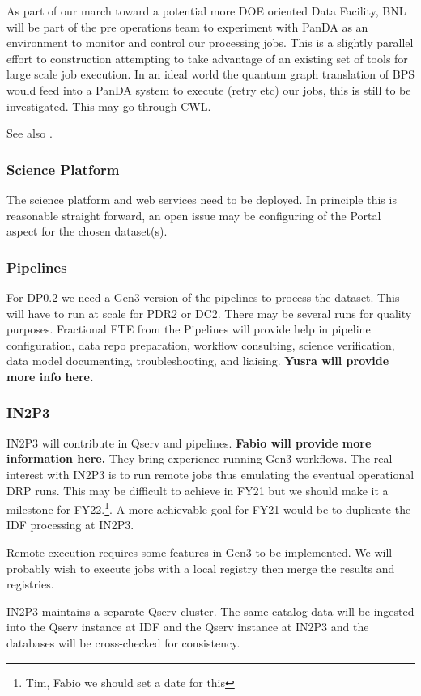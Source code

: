 As part of our march toward a potential more DOE oriented Data Facility, BNL will be part of the pre operations team to experiment with PanDA as an environment to monitor and control our processing jobs.
This is a slightly parallel effort to construction attempting to take advantage of an existing set of tools for large scale job execution.
In an ideal world the quantum graph translation of BPS would feed into a PanDA system to execute (retry etc) our jobs, this is still to be investigated. This may go through CWL.

See also .




\subsubsection{ Science Platform}
The science platform and web services need to be deployed. In principle this is reasonable straight forward, an open issue may be configuring of the Portal aspect for the chosen  dataset(s).

\subsubsection{ Pipelines }
For DP0.2 we need a Gen3 version of the pipelines to process the dataset. This will have to run at scale for PDR2 or DC2. There may be several runs for quality purposes.
Fractional FTE from the Pipelines will provide help in pipeline configuration, data repo preparation, workflow consulting, science verification, data model documenting, troubleshooting, and liaising.
{\bf Yusra will provide more info here.}

\subsubsection{ IN2P3}\label{sec:in2p3}
IN2P3 will contribute in Qserv and pipelines. {\bf Fabio will provide more information here.}
They bring experience running Gen3 workflows. The real interest with IN2P3 is to run remote jobs thus emulating the eventual operational DRP runs. This may be difficult to achieve in FY21 but we should make it a milestone for FY22.\footnote{Tim, Fabio we should set a date for this}. A more achievable goal for FY21 would be to duplicate the IDF processing at IN2P3.

Remote execution requires some  features in Gen3 to be implemented. We will probably wish to execute jobs with a local registry then merge the results and registries.

IN2P3 maintains a separate Qserv cluster.
The same catalog data will be ingested into the Qserv instance at IDF and the Qserv instance at IN2P3 and the databases will be cross-checked for consistency.
